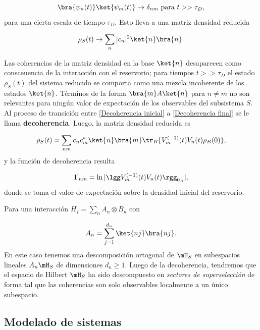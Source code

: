 \begin{equation}
    \bra{\psi_n(t)}\ket{{\psi_m(t)}} \rightarrow \delta_{nm} \textnormal{ para } t >> \tau_{D},
    \label{Decoherencia final}
\end{equation}
para una cierta escala de tiempo $\tau_{D}$. Esto lleva a una matriz densidad reducida

\begin{equation}
    \rho_S (t) \rightarrow \sum_{n} |c_n|^2 \ket{n}\bra{n}. 
\end{equation}

Las coherencias de la matriz densidad en la base $\ket{n}$ desaparecen como consceuencia de la interacción con el reservorio; para tiempos $t >> \tau_D$ el estado $\rho_S(t)$ del sistema reducido se comporta como una mezcla incoherente de los estados $\ket{n}$. Términos de la forma $\bra{m}A\ket{n}$ para $n \neq m$ no son relevantes para ningún valor de expectación de los observables del subsistema $S$. Al proceso de transición entre \eqref{Decoherencia inicial}
a \eqref{Decoherencia final} se le llama \textbf{decoherencia}.  
Luego, la matriz densidad reducida es

\begin{equation}
    \rho_S (t) = \sum_{nm} c_n c_m^{*} \ket{n}\bra{m} \tr_{B} \{V_m^{(-1)}(t) V_n(t) \rho_B(0)\},
\end{equation}
y la función de decoherencia resulta

\begin{equation}
    \Gamma_{nm} = \ln |\lgg V_{m}^{(-1)}(t)V_n(t) \rgg_{0_{B}}|,
\end{equation}
donde se toma el valor de expectación sobre la densidad inicial del reservorio. 

Para una interacción $H_I = \sum_n A_n \otimes B_n$ con 

\begin{equation}
    A_n = \sum_{j=1}^{d_n} \ket{nj}\bra{nj}.
\end{equation}
En este caso tenemos una descomposición ortogonal de $\mH_S$ en subespacios lineales $A_n\mH_S $ de dimensiones $d_n \geq 1$. Luego de la decoherencia, tendremos que el espacio de Hilbert $\mH_S$ ha sido descompuesto en \textit{sectores de superselección} de forma tal que las coherencias son solo observables localmente a un único subespacio. 
 
 \subsection{Modelado de sistemas}

